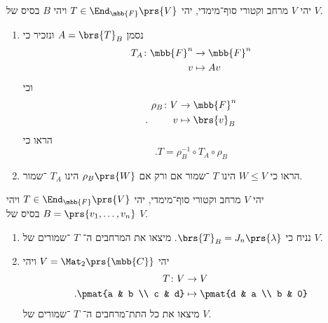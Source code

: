 \documentclass[a4paper,10pt,twoside,openany]{article}
\begin{document}
\pagebreak

\begin{exercise}
יהי
$V$
מרחב וקטורי סוף־מימדי, יהי
$T \in \End_{\mbb{F}}\prs{V}$
ויהי
$B$
בסיס של
$V$.

\begin{enumerate}
\item נסמן
$A = \brs{T}_B$
ונזכיר כי
\begin{align*}
T_A \colon \mbb{F}^n &\to \mbb{F}^n \\
v &\mapsto Av
\end{align*}
וכי
\begin{align*}
\rho_B \colon V &\to \mbb{F}^n \\
\text{.} \hphantom{lalala} v &\mapsto \brs{v}_B
\end{align*}
הראו כי
\[\text{.} T = \rho_B^{-1} \circ T_A \circ \rho_B\]

\item
הראו כי
$W \leq V$
הינו
$T$%
־שמור אם ורק אם
$\rho_B\prs{W}$
הינו
$T_A$%
־שמור.
\end{enumerate}
\end{exercise}

\begin{exercise}
יהי
$V$
מרחב וקטורי סוף־מימדי, יהי
$T \in \End_{\mbb{F}}\prs{V}$
ויהי
$B = \prs{v_1, \ldots, v_n}$
בסיס של
$V$.
\begin{enumerate}
\item נניח כי
$\brs{T}_B = J_n\prs{\lambda}$.
מיצאו את המרחבים ה־%
$T$%
־שמורים של
$V$.

\item
יהי
$V = \Mat_2\prs{\mbb{C}}$
ויהי
\begin{align*}
T \colon V &\to V \\
\text{.} \pmat{a & b \\ c & d} &\mapsto \pmat{d & a \\ b & 0}
\end{align*}
מיצאו את כל התת־מרחבים ה־%
$T$%
־שמורים של
$V$.
\end{enumerate}
\end{exercise}
\end{document}
